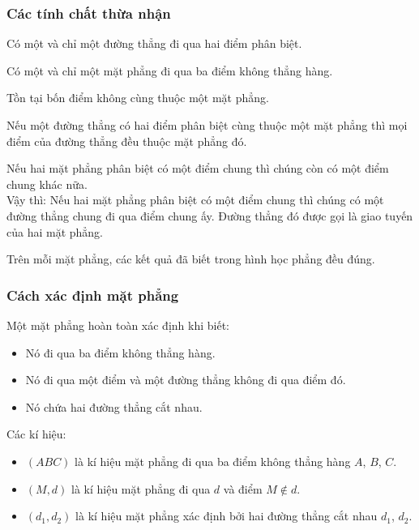 \subsubsection{Các tính chất thừa nhận}
\begin{tcolorbox}[colback=orange!10!white,breakable]
	\begin{tc}
		Có một và chỉ một đường thẳng đi qua hai điểm phân biệt.
	\end{tc}
	\begin{tc}
		Có một và chỉ một mặt phẳng đi qua ba điểm không thẳng hàng.
	\end{tc}
	\begin{tc}
		Tồn tại bốn điểm không cùng thuộc một mặt phẳng.
	\end{tc}
	\begin{tc}
		Nếu một đường thẳng có hai điểm phân biệt cùng thuộc một mặt phẳng thì mọi điểm của đường thẳng đều thuộc mặt phẳng đó.
	\end{tc}
	\begin{tc}
		Nếu hai mặt phẳng phân biệt có một điểm chung thì chúng còn có một điểm chung khác nữa.\\
		Vậy thì: Nếu hai mặt phẳng phân biệt có một điểm chung thì chúng có một đường thẳng chung đi qua điểm chung ấy. Đường thẳng đó được gọi là giao tuyến của hai mặt phẳng.
	\end{tc}
	\begin{tc}
		Trên mỗi mặt phẳng, các kết quả đã biết trong hình học phẳng đều đúng.
	\end{tc}
\end{tcolorbox}
\subsubsection{Cách xác định mặt phẳng}
\begin{tcolorbox}[colback=orange!10!white,breakable]
Một mặt phẳng hoàn toàn xác định khi biết:
\begin{itemize}
	\item Nó đi qua ba điểm không thẳng hàng.
	\item Nó đi qua một điểm và một đường thẳng không đi qua điểm đó.
	\item Nó chứa hai đường thẳng cắt nhau.
\end{itemize}	
\end{tcolorbox}
Các kí hiệu:
\begin{itemize}
	\item $(ABC)$ là kí hiệu mặt phẳng đi qua ba điểm không thẳng hàng $A$, $B$, $C$.
	\item $(M,d)$ là kí hiệu mặt phẳng đi qua $d$ và điểm $M\notin d$.
	\item $(d_1,d_2)$ là kí hiệu mặt phẳng xác định bởi hai đường thẳng cắt nhau $d_1$, $d_2$.
\end{itemize}

